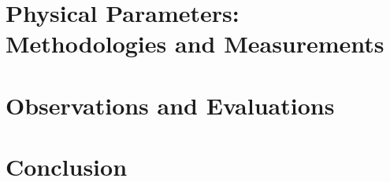\documentclass{article}
\begin{document}
\section{Physical Parameters: Methodologies and Measurements}


\section{Observations and Evaluations}


\section{Conclusion}




\end{document}
